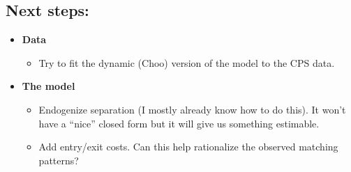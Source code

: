 \documentclass{article}
\begin{document}
\subsection*{Next steps:}
\begin{itemize}
\item \textbf{Data}
\begin{itemize}
\item Try to fit the dynamic (Choo) version of the model to the CPS data.
\end{itemize}
\item \textbf{The model}
\begin{itemize}
\item Endogenize separation (I mostly already know how to do this). It won't have a ``nice'' closed form but it will give us something estimable.
\item Add entry/exit costs. Can this help rationalize the observed matching patterns?
\end{itemize}
\end{itemize}

\newpage

%
\end{document}
